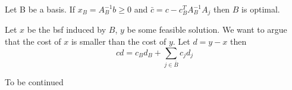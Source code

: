 \begin{thm}\label{Pr:simplexIIIopt} Let B be a basis. If $x_B=A^{-1}_Bb\geq 0$ and $\bar c=c-c_B^{T}A_B^{-1}A_j$ then $B$ is optimal.\end{thm}

\begin{pr} Let $x$ be the bsf induced by $B$, $y$ be some feasible solution. We want to argue that the cost of $x$ is smaller than the cost of $y$. Let $d=y-x$ then 
\[cd = c_Bd_B + \sum_{j\in \bar B} c_jd_j \] 

To be continued
\end{pr}
